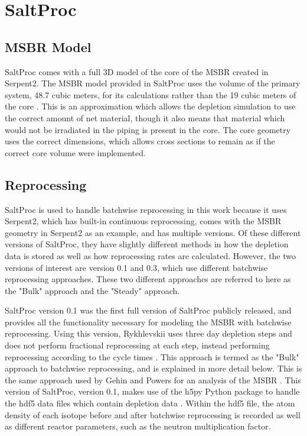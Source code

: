 \section{SaltProc}
\label{s:theSaltProc}

\subsection{MSBR Model}

SaltProc comes with a full 3D model of the core of the MSBR created in Serpent2.
The MSBR model provided in SaltProc uses the volume of the primary system, 48.7 cubic meters, for its calculations rather than the 19 cubic meters of the core \cite{rykhlevskii_modeling_2019}.
This is an approximation which allows the depletion simulation to use the correct amount of net material, though it also means that material which would not be irradiated in the piping is present in the core.
The core geometry uses the correct dimensions, which allows cross sections to remain as if the correct core volume were implemented.

\subsection{Reprocessing}
\label{s:SP-repr}

SaltProc is used to handle batchwise reprocessing in this work because it uses Serpent2, which has built-in continuous reprocessing, comes with the MSBR geometry in Serpent2 as an example, and has multiple versions.
Of these different versions of SaltProc, they have slightly different methods in how the depletion data is stored as well as how reprocessing rates are calculated.
However, the two versions of interest are version 0.1 and 0.3, which use different batchwise reprocessing approaches.
These two different approaches are referred to here as the "Bulk" approach and the "Steady" approach.

SaltProc version 0.1 was the first full version of SaltProc publicly released, and provides all the functionality necessary for modeling the MSBR with batchwise reprocessing.
Using this version, Rykhlevskii uses three day depletion steps and does not perform fractional reprocessing at each step, instead performing reprocessing according to the cycle times \cite{rykhlevskii_advanced_2018}.
This approach is termed as the "Bulk" approach to batchwise reprocessing, and is explained in more detail below. This is the same approach used by Gehin and Powers for an analysis of the MSBR \cite{gehin_liquid_2016}.
This version of SaltProc, version 0.1, makes use of the h5py Python package to handle the hdf5 data files which contain depletion data \cite{collette_python_hdf5_2014}. Within the hdf5 file, the atom density of each isotope before and after batchwise reprocessing is recorded as well as different reactor parameters, such as the neutron multiplication factor.

